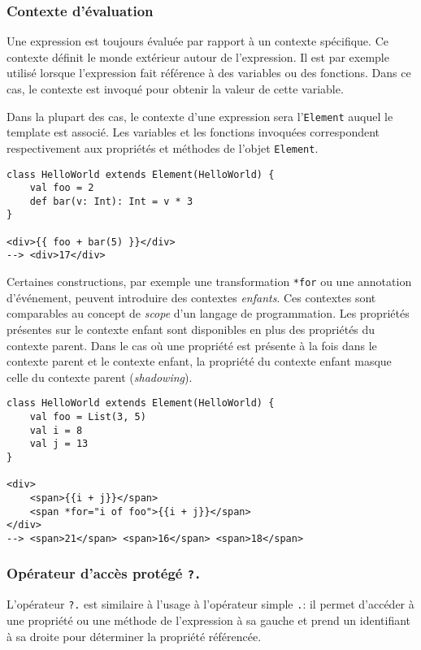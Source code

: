 \subsubsection{Contexte d'évaluation}
Une expression est toujours évaluée par rapport à un contexte spécifique. Ce contexte définit le monde extérieur autour de l'expression. Il est par exemple utilisé lorsque l'expression fait référence à des variables ou des fonctions. Dans ce cas, le contexte est invoqué pour obtenir la valeur de cette variable.

Dans la plupart des cas, le contexte d'une expression sera l'\texttt{Element} auquel le template est associé. Les variables et les fonctions invoquées correspondent respectivement aux propriétés et méthodes de l'objet \texttt{Element}.

\begin{lstlisting}
class HelloWorld extends Element(HelloWorld) {
	val foo = 2
	def bar(v: Int): Int = v * 3
}

<div>{{ foo + bar(5) }}</div>
--> <div>17</div>
\end{lstlisting}

Certaines constructions, par exemple une transformation \texttt{*for} ou une annotation d'événement, peuvent introduire des contextes \emph{enfants}. Ces contextes sont comparables au concept de \emph{scope} d'un langage de programmation. Les propriétés présentes sur le contexte enfant sont disponibles en plus des propriétés du contexte parent. Dans le cas où une propriété est présente à la fois dans le contexte parent et le contexte enfant, la propriété du contexte enfant masque celle du contexte parent (\emph{shadowing}).

\begin{lstlisting}
class HelloWorld extends Element(HelloWorld) {
	val foo = List(3, 5)
	val i = 8
	val j = 13
}

<div>
	<span>{{i + j}}</span>
	<span *for="i of foo">{{i + j}}</span>
</div>
--> <span>21</span> <span>16</span> <span>18</span>
\end{lstlisting}

\subsubsection{Opérateur d'accès protégé \texttt{?.}}
L'opérateur \texttt{?.} est similaire à l'usage à l'opérateur simple \texttt{.}: il permet d'accéder à une propriété ou une méthode de l'expression à sa gauche et prend un identifiant à sa droite pour déterminer la propriété référencée.

